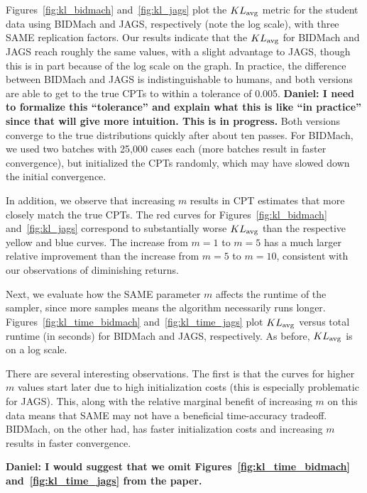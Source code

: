 \documentclass{article} %
\begin{document}
Figures~\ref{fig:kl_bidmach} and~\ref{fig:kl_jags} plot the $KL_{\rm avg}$ metric for the student
data using BIDMach and JAGS, respectively (note the log scale), with three SAME replication factors.
Our results indicate that the $KL_{\rm avg}$ for BIDMach and JAGS reach roughly the same values,
with a slight advantage to JAGS, though this is in part because of the log scale on the graph. In
practice, the difference between BIDMach and JAGS is indistinguishable to humans, and both versions
are able to get to the true CPTs to within a tolerance of 0.005.  \textbf{Daniel: I need to
formalize this ``tolerance'' and explain what this is like ``in practice'' since that will give more
intuition.  This is in progress.} Both versions converge to the true distributions quickly after
about ten passes. For BIDMach, we used two batches with 25,000 cases each (more batches result in
faster convergence), but initialized the CPTs randomly, which may have slowed down the initial
convergence.

In addition, we observe that increasing $m$ results in CPT estimates that more closely match the
true CPTs. The red curves for Figures~\ref{fig:kl_bidmach} and~\ref{fig:kl_jags} correspond to
substantially worse $KL_{\rm avg}$ than the respective yellow and blue curves. The increase from
$m=1$ to $m=5$ has a much larger relative improvement than the increase from $m=5$ to $m=10$,
consistent with our observations of diminishing returns.

Next, we evaluate how the SAME parameter $m$ affects the runtime of the sampler, since more samples
means the algorithm necessarily runs longer. Figures~\ref{fig:kl_time_bidmach}
and~\ref{fig:kl_time_jags} plot $KL_{\rm avg}$ versus total runtime (in seconds) for BIDMach and
JAGS, respectively. As before, $KL_{\rm avg}$ is on a log scale.

There are several interesting observations. The first is that the curves for higher $m$ values start
later due to high initialization costs (this is especially problematic for JAGS). This, along with
the relative marginal benefit of increasing $m$ on this data means that SAME may not have a
beneficial time-accuracy tradeoff. BIDMach, on the other had, has faster initialization costs and
increasing $m$ results in faster convergence.

\textbf{Daniel: I would suggest that we omit Figures~\ref{fig:kl_time_bidmach}
and~\ref{fig:kl_time_jags} from the paper.}
\end{document}
